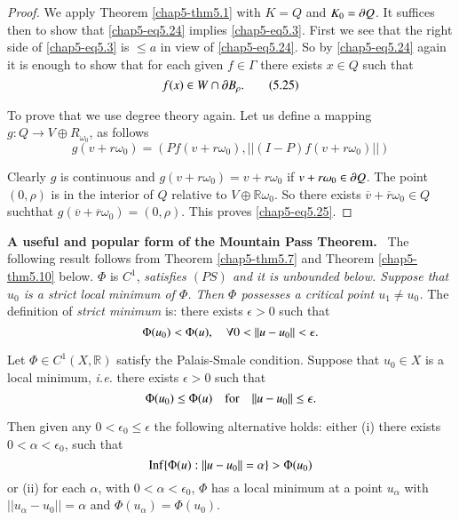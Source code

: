 \begin{proof}
We apply Theorem \ref{chap5-thm5.1} with $K=Q$ and $K_{0}=\partial Q$. It
suffices then to show that \eqref{chap5-eq5.24} implies
\eqref{chap5-eq5.3}. First we see that the right side of
\eqref{chap5-eq5.3} is $\leq a$ in view of \eqref{chap5-eq5.24}. So by
\eqref{chap5-eq5.24} again it is enough to show that for each given
$f\in\Gamma$ there exists $x\in Q$ such that
\begin{equation*}
f(x)\in W\cap \partial B_{\rho}.\tag{5.25}\label{chap5-eq5.25}
\end{equation*}

To prove that we use degree theory again. Let us define a mapping
$g:Q\to V\oplus R_{\omega_{0}}$, as follows
$$
g(v+r\omega_{0})=(Pf(v+r\omega_{0}),||(I-P)f(v+r\omega_{0})||)
$$

Clearly $g$ is continuous and $g(v+r\omega_{0})=v+r\omega_{0}$ if
$v+r\omega_{0}\in \partial Q$. The point $(0,\rho)$ is in the interior of
$Q$ relative to $V\oplus \mathbb{R}\omega_{0}$. So there exists
$\overline{v}+\overline{r}\omega_{0}\in Q$ such\pageoriginale that
$g(\overline{v}+\overline{r}\omega_{0})=(0,\rho)$. This proves
\eqref{chap5-eq5.25}. 
\end{proof}

\noindent
{\bf A useful and popular form of the Mountain Pass Theorem.}~ The
following result follows from Theorem \ref{chap5-thm5.7} and Theorem
\ref{chap5-thm5.10} below. $\Phi$ is $C^{1}$, {\em satisfies $(PS)$
  and it is unbounded below. Suppose that $u_{0}$ is a strict local
  minimum of $\Phi$. Then $\Phi$ possesses a critical point $u_{1}\neq
  u_{0}$.} The definition of {\em strict minimum} is: there exists
$\epsilon>0$ such that
$$
\Phi(u_{0})<\Phi(u),\q \forall 0<||u-u_{0}||<\epsilon.
$$

\begin{theorem}\label{chap5-thm5.10}
Let $\Phi\in C^{1}(X,\mathbb{R})$ satisfy the Palais-Smale
condition. Suppose that $u_{0}\in X$ is a local minimum, {\em i.e.}
there exists $\epsilon>0$ such that
$$
\Phi(u_{0})\leq \Phi(u)\quad\text{for}\quad ||u-u_{0}||\leq \epsilon.
$$

Then given any $0<\epsilon_{0}\leq \epsilon$ the following alternative
holds: either {\rm(i)} there exists $0<\alpha<\epsilon_{0}$, such
that
$$
\operatorname{Inf}\{\Phi(u):||u-u_{0}||=\alpha\}>\Phi(u_{0})
$$
or {\rm(ii)} for each $\alpha$, with $0<\alpha<\epsilon_{0}$, $\Phi$
has a local minimum at a point $u_{\alpha}$ with
$||u_{\alpha}-u_{0}||=\alpha$ and $\Phi(u_{\alpha})=\Phi(u_{0})$. 
\end{theorem}

